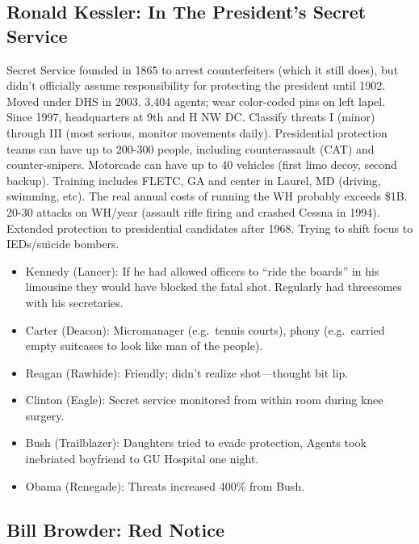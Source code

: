 \documentclass[
]{article}
\begin{document}
\hypertarget{ronald-kessler-in-the-presidents-secret-service}{%
\subsection{Ronald Kessler: In The President's Secret
Service}\label{ronald-kessler-in-the-presidents-secret-service}}

Secret Service founded in 1865 to arrest counterfeiters (which it still
does), but didn't officially assume responsibility for protecting the
president until 1902. Moved under DHS in 2003. 3,404 agents; wear
color-coded pins on left lapel. Since 1997, headquarters at 9th and H NW
DC. Classify threats I (minor) through III (most serious, monitor
movements daily). Presidential protection teams can have up to 200-300
people, including counterassault (CAT) and counter-snipers. Motorcade
can have up to 40 vehicles (first limo decoy, second backup). Training
includes FLETC, GA and center in Laurel, MD (driving, swimming, etc).
The real annual costs of running the WH probably exceeds \$1B. 20-30
attacks on WH/year (assault rifle firing and crashed Cessna in 1994).
Extended protection to presidential candidates after 1968. Trying to
shift focus to IEDs/suicide bombers.

\begin{itemize}
\item
  Kennedy (Lancer): If he had allowed officers to ``ride the boards'' in
  his limousine they would have blocked the fatal shot. Regularly had
  threesomes with his secretaries.
\item
  Carter (Deacon): Micromanager (e.g.~tennis courts), phony
  (e.g.~carried empty suitcases to look like man of the people).
\item
  Reagan (Rawhide): Friendly; didn't realize shot---thought bit lip.
\item
  Clinton (Eagle): Secret service monitored from within room during knee
  surgery.
\item
  Bush (Trailblazer): Daughters tried to evade protection, Agents took
  inebriated boyfriend to GU Hospital one night.
\item
  Obama (Renegade): Threats increased 400\% from Bush.
\end{itemize}

\hypertarget{bill-browder-red-notice}{%
\subsection{Bill Browder: Red Notice}\label{bill-browder-red-notice}}
\end{document}
